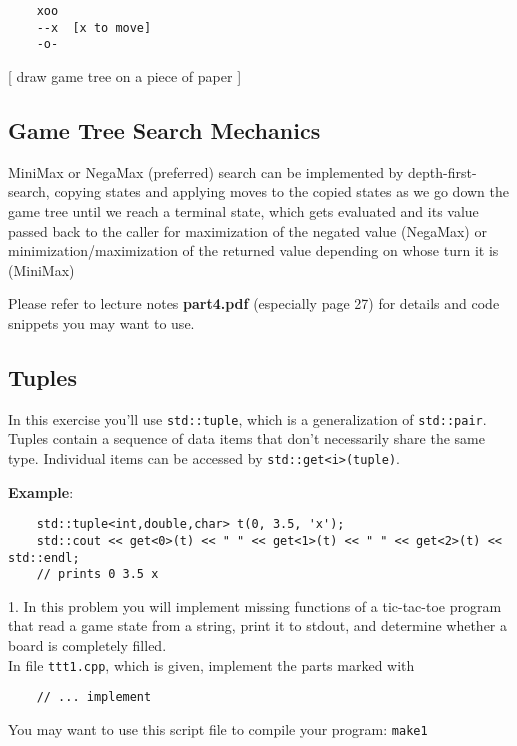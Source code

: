 \documentclass[a4paper,11pt]{article}
\begin{document}
{\small
\begin{verbatim}
    xoo
    --x  [x to move]
    -o- 
\end{verbatim}
}
[ draw game tree on a piece of paper ]


\subsection*{Game Tree Search Mechanics}
MiniMax or NegaMax (preferred) search can be implemented by
depth-first-search, copying states and applying moves to the copied states as
we go down the game tree until we reach a terminal state, which gets evaluated
and its value passed back to the caller for maximization of the negated value
(NegaMax) or minimization/maximization of the returned value depending on
whose turn it is (MiniMax)

\medskip

Please refer to lecture notes \textbf{part4.pdf} 
(especially page 27) for details and code snippets you may want to use.



\subsection*{Tuples}
In this exercise you'll use \texttt{std::tuple}, which is a generalization
of \texttt{std::pair}. Tuples contain a sequence of data items that don't
necessarily share the same type. Individual items can be accessed by
\texttt{std::get<i>(tuple)}.

\medskip

\textbf{Example}:
{\small
\begin{verbatim}
    std::tuple<int,double,char> t(0, 3.5, 'x');
    std::cout << get<0>(t) << " " << get<1>(t) << " " << get<2>(t) << std::endl;
    // prints 0 3.5 x
\end{verbatim}
}


\linerule

1. In this problem you will implement missing functions of a tic-tac-toe program
that read a game state from a string, print it to stdout, and determine
whether a board is completely filled.\\

In file \texttt{ttt1.cpp}, which is given, implement the parts marked with

{\small
\begin{verbatim}
    // ... implement
\end{verbatim}
}

You may want to use this script file to compile your program: \texttt{make1}
\end{document}
